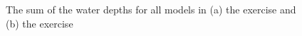 \documentclass{isprs}
\begin{document}
\begin{figure}
\begin{center}
\caption{The sum of the water depths for all models in (a) the  exercise and (b) the  exercise}
\label{fig:sum_depth}
\end{center}
\end{figure}
%
\end{document}
